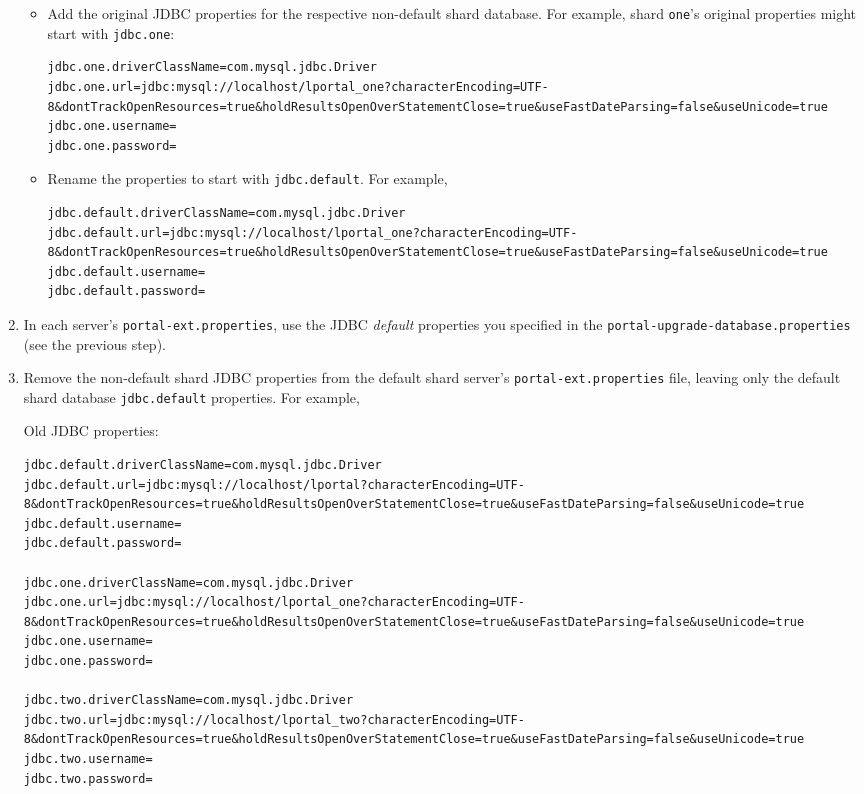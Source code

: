\begin{enumerate}
  \begin{itemize}
  \item
    Add the original JDBC properties for the respective non-default
    shard database. For example, shard \texttt{one}'s original
    properties might start with \texttt{jdbc.one}:

\begin{verbatim}
jdbc.one.driverClassName=com.mysql.jdbc.Driver
jdbc.one.url=jdbc:mysql://localhost/lportal_one?characterEncoding=UTF-8&dontTrackOpenResources=true&holdResultsOpenOverStatementClose=true&useFastDateParsing=false&useUnicode=true
jdbc.one.username=
jdbc.one.password=
\end{verbatim}
  \item
    Rename the properties to start with \texttt{jdbc.default}. For
    example,

\begin{verbatim}
jdbc.default.driverClassName=com.mysql.jdbc.Driver
jdbc.default.url=jdbc:mysql://localhost/lportal_one?characterEncoding=UTF-8&dontTrackOpenResources=true&holdResultsOpenOverStatementClose=true&useFastDateParsing=false&useUnicode=true
jdbc.default.username=
jdbc.default.password=
\end{verbatim}
  \end{itemize}
\item
  In each server's \texttt{portal-ext.properties}, use the JDBC
  \emph{default} properties you specified in the
  \texttt{portal-upgrade-database.properties} (see the previous step).
\item
  Remove the non-default shard JDBC properties from the default shard
  server's \texttt{portal-ext.properties} file, leaving only the default
  shard database \texttt{jdbc.default} properties. For example,

  Old JDBC properties:

\begin{verbatim}
jdbc.default.driverClassName=com.mysql.jdbc.Driver
jdbc.default.url=jdbc:mysql://localhost/lportal?characterEncoding=UTF-8&dontTrackOpenResources=true&holdResultsOpenOverStatementClose=true&useFastDateParsing=false&useUnicode=true
jdbc.default.username=
jdbc.default.password=

jdbc.one.driverClassName=com.mysql.jdbc.Driver
jdbc.one.url=jdbc:mysql://localhost/lportal_one?characterEncoding=UTF-8&dontTrackOpenResources=true&holdResultsOpenOverStatementClose=true&useFastDateParsing=false&useUnicode=true
jdbc.one.username=
jdbc.one.password=

jdbc.two.driverClassName=com.mysql.jdbc.Driver
jdbc.two.url=jdbc:mysql://localhost/lportal_two?characterEncoding=UTF-8&dontTrackOpenResources=true&holdResultsOpenOverStatementClose=true&useFastDateParsing=false&useUnicode=true
jdbc.two.username=
jdbc.two.password=
\end{verbatim}


\end{enumerate}
